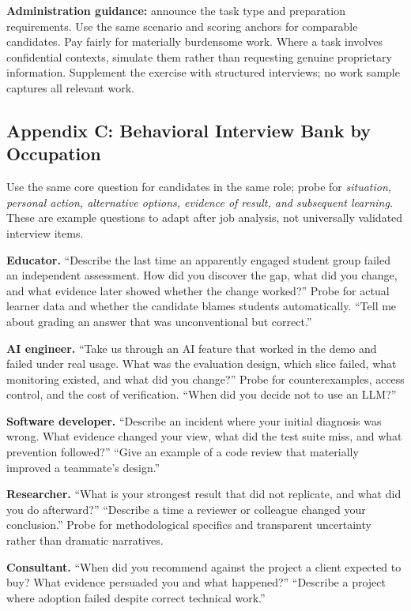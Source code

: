 \noindent\textbf{Administration guidance:} announce the task type and preparation requirements. Use the same scenario and scoring anchors for comparable candidates. Pay fairly for materially burdensome work. Where a task involves confidential contexts, simulate them rather than requesting genuine proprietary information. Supplement the exercise with structured interviews; no work sample captures all relevant work.

\subsection*{Appendix C: Behavioral Interview Bank by Occupation}

Use the same core question for candidates in the same role; probe for \textit{situation, personal action, alternative options, evidence of result, and subsequent learning}. These are example questions to adapt after job analysis, not universally validated interview items.

\textbf{Educator.} ``Describe the last time an apparently engaged student group failed an independent assessment. How did you discover the gap, what did you change, and what evidence later showed whether the change worked?'' Probe for actual learner data and whether the candidate blames students automatically. ``Tell me about grading an answer that was unconventional but correct.''

\textbf{AI engineer.} ``Take us through an AI feature that worked in the demo and failed under real usage. What was the evaluation design, which slice failed, what monitoring existed, and what did you change?'' Probe for counterexamples, access control, and the cost of verification. ``When did you decide not to use an LLM?''

\textbf{Software developer.} ``Describe an incident where your initial diagnosis was wrong. What evidence changed your view, what did the test suite miss, and what prevention followed?'' ``Give an example of a code review that materially improved a teammate's design.''

\textbf{Researcher.} ``What is your strongest result that did not replicate, and what did you do afterward?'' ``Describe a time a reviewer or colleague changed your conclusion.'' Probe for methodological specifics and transparent uncertainty rather than dramatic narratives.

\textbf{Consultant.} ``When did you recommend against the project a client expected to buy? What evidence persuaded you and what happened?'' ``Describe a project where adoption failed despite correct technical work.''

